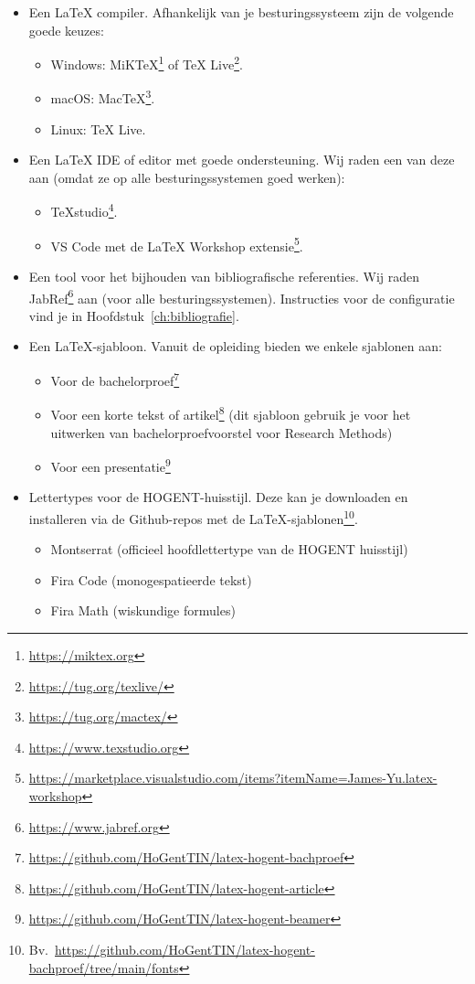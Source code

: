 \begin{itemize}
  \item Een {\LaTeX} compiler. Afhankelijk van je besturingssysteem zijn de volgende goede keuzes:
  \begin{itemize}
    \item Windows: MiKTeX\footnote{\url{https://miktex.org}} of TeX Live\footnote{\url{https://tug.org/texlive/}}.
    \item macOS: MacTeX\footnote{\url{https://tug.org/mactex/}}.
    \item Linux: TeX Live.
  \end{itemize}
  \item Een {\LaTeX} IDE of editor met goede ondersteuning. Wij raden een van deze aan (omdat ze op alle besturingssystemen goed werken):
  \begin{itemize}
    \item TeXstudio\footnote{\url{https://www.texstudio.org}}.
    \item VS Code met de LaTeX Workshop extensie\footnote{\url{https://marketplace.visualstudio.com/items?itemName=James-Yu.latex-workshop}}.
  \end{itemize}
  \item Een tool voor het bijhouden van bibliografische referenties. Wij raden JabRef\footnote{\url{https://www.jabref.org}} aan (voor alle besturingssystemen). Instructies voor de configuratie vind je in Hoofdstuk~\ref{ch:bibliografie}.
  \item Een {\LaTeX}-sjabloon. Vanuit de opleiding bieden we enkele sjablonen aan:
  \begin{itemize}
    \item Voor de bachelorproef\footnote{\url{https://github.com/HoGentTIN/latex-hogent-bachproef}}
    \item Voor een korte tekst of artikel\footnote{\url{https://github.com/HoGentTIN/latex-hogent-article}} (dit sjabloon gebruik je voor het uitwerken van bachelorproefvoorstel voor Research Methods)
    \item Voor een presentatie\footnote{\url{https://github.com/HoGentTIN/latex-hogent-beamer}}
  \end{itemize}
  \item Lettertypes voor de HOGENT-huisstijl. Deze kan je downloaden en installeren via de Github-repos met de {\LaTeX}-sjablonen\footnote{Bv.\ \url{https://github.com/HoGentTIN/latex-hogent-bachproef/tree/main/fonts}}.
  \begin{itemize}
    \item Montserrat (officieel hoofdlettertype van de HOGENT huisstijl)
    \item Fira Code (monogespatieerde tekst)
    \item Fira Math (wiskundige formules)
  \end{itemize}
\end{itemize}

